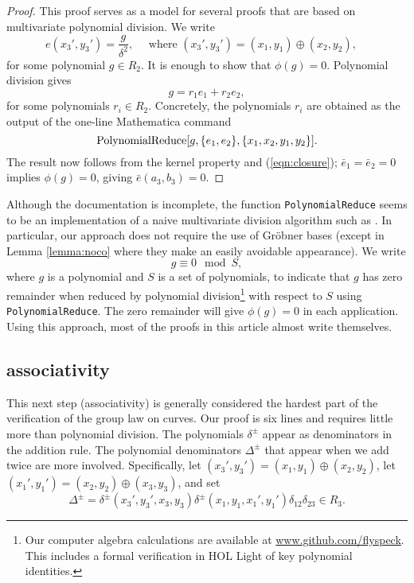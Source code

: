 \documentclass[18pt]{article}
\newcommand{\op}[1]{\hbox{#1}}
\def\cong{\equiv}
\begin{document}
\begin{proof} This proof serves as a model for several proofs that
  are based on multivariate polynomial division.  We write
\[
e(x_3',y_3') = \frac{g}{\delta^2},\quad \text{ where } (x_3',y_3')=(x_1,y_1) \oplus (x_2,y_2) ,\quad 
\]
for some polynomial $g \in R_2$.  It is enough to show that $\phi(g)=0$.
Polynomial division gives
\begin{equation}\label{eqn:closure}
g= r_1 e_1 + r_2 e_2,
\end{equation}
for some polynomials $r_i\in R_2$.  Concretely, the polynomials $r_i$
are obtained as the output of the one-line Mathematica command
\[
\op{PolynomialReduce}[g,\{e_1,e_2\},\{x_1,x_2,y_1,y_2\}].
\]
The result now follows from the kernel
property and (\ref{eqn:closure}); $\bar e_1 = \bar e_2 = 0$ implies
$\phi(g)= 0$, giving ${\bar e}(a_3,b_3)=0$.
\end{proof}

 Although the documentation is incomplete, the function {\tt PolynomialReduce}
  seems to be
  an implementation of a naive multivariate 
  division algorithm such as \cite{cox1992ideals}.  In particular, our
  approach does not require the use of Gr\"obner bases (except in
  Lemma \ref{lemma:noco} 
  where they make an easily avoidable appearance).  We write
\[
g \cong 0 \mod S,
\]
where $g$ is a polynomial and $S$ is a set of polynomials, to indicate
that $g$ has zero remainder when reduced by polynomial division\footnote{Our computer algebra
calculations are available at \url{www.github.com/flyspeck}.  This includes
a formal verification in HOL Light of key polynomial identities.} with
respect to $S$ using {\tt PolynomialReduce}.  The zero remainder will
give $\phi(g)=0$ in each application.  Using this approach, most of the
proofs in this article almost write themselves.


\subsection{associativity}

This next step (associativity) is generally considered the hardest
part of the verification of the group law on curves.  Our proof is six lines
and requires little more than polynomial division.  The polynomials
$\delta^\pm$ appear as denominators in the addition rule.  The
polynomial denominators $\Delta^\pm$ that appear when we add twice are
more involved.  Specifically, let $ (x_3',y_3')=(x_1,y_1) \oplus
(x_2,y_2)$, let $(x_1',y_1')=(x_2,y_2) \oplus (x_3,y_3) $, and set
\[
\Delta^{\pm} = \delta^\pm(x_3',y_3',x_3,y_3)
\delta^\pm(x_1,y_1,x_1',y_1')\delta_{12}\delta_{23}\in R_3.
\]
\end{document}
